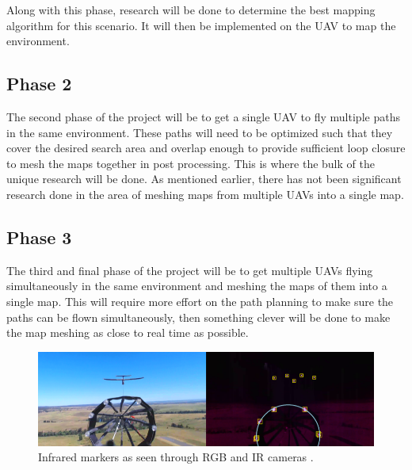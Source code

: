 \documentclass[12pt, letterpaper]{article}
\begin{document}
Along with this phase, research will be done to determine the best mapping algorithm for this scenario. It will then be implemented on the UAV to map the environment. 

\subsection{Phase 2}
The second phase of the project will be to get a single UAV to fly multiple paths in the same environment. These paths will need to be optimized such that they cover the desired search area and overlap enough to provide sufficient loop closure to mesh the maps together in post processing. This is where the bulk of the unique research will be done. As mentioned earlier, there has not been significant research done in the area of meshing maps from multiple UAVs into a single map. 

\subsection{Phase 3}
The third and final phase of the project will be to get multiple UAVs flying simultaneously in the same environment and meshing the maps of them into a single map. This will require more effort on the path planning to make sure the paths can be flown simultaneously, then something clever will be done to make the map meshing as close to real time as possible. 

\begin{figure}[t] %
   \centering
   \includegraphics[trim = 0mm 0mm 0mm 0mm,clip,width=6in]{ir_drogue.png}
   \caption{Infrared markers as seen through RGB and IR cameras \cite{WilsonDB.2015}.}
   \label{fig:irmarkers}
\end{figure}
\end{document}
